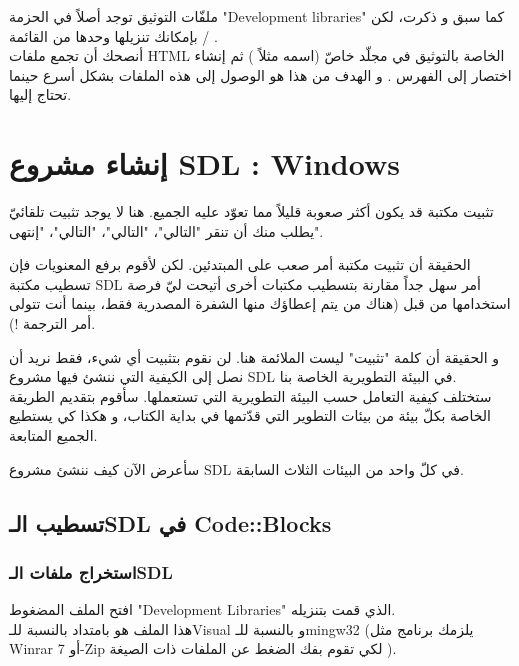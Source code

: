 ملفّات التوثيق توجد أصلاً في الحزمة
"\textenglish{Development libraries}"
كما سبق و ذكرت، لكن بإمكانك تنزيلها وحدها من القائمة
 / .\\
أنصحك أن تجمع ملفات
\textenglish{HTML}
الخاصة بالتوثيق في مجلّد خاصّ (اسمه مثلاً
)
ثم إنشاء اختصار إلى الفهرس
.
و الهدف من هذا هو الوصول إلى هذه الملفات بشكل أسرع حينما تحتاج إليها.

\section{إنشاء مشروع \textenglish{SDL} : \textenglish{Windows}}

تثبيت مكتبة قد يكون أكثر صعوبة قليلاً مما تعوّد عليه الجميع. هنا لا يوجد تثبيت تلقائيّ يطلب منك أن تنقر "التالي"، "التالي"، "التالي"، "إنتهى".

الحقيقة أن تثبيت مكتبة أمر صعب على المبتدئين. لكن لأقوم برفع المعنويات فإن تسطيب مكتبة 
\textenglish{SDL}
أمر سهل جداً مقارنة بتسطيب مكتبات أخرى أتيحت ليّ فرصة استخدامها من قبل (هناك من يتم إعطاؤك منها الشفرة المصدرية فقط، بينما أنت تتولى أمر الترجمة !).

و الحقيقة أن كلمة "تثبيت" ليست الملائمة هنا. لن نقوم بتثبيت أي شيء، فقط نريد أن نصل إلى الكيفية التي ننشئ فيها مشروع 
\textenglish{SDL}
في البيئة التطويرية الخاصة بنا.\\
ستختلف كيفية التعامل حسب البيئة التطويرية التي تستعملها. سأقوم بتقديم الطريقة الخاصة بكلّ بيئة من بيئات التطوير التي قدّتمها في بداية الكتاب، و هكذا كي يستطيع الجميع المتابعة.

سأعرض الآن كيف ننشئ مشروع
\textenglish{SDL}
في كلّ واحد من البيئات الثلاث السابقة.

\subsection{تسطيب الـ\textenglish{SDL} في \textenglish{Code::Blocks}}

\subsubsection{استخراج ملفات الـ\textenglish{SDL}}

افتح الملف المضغوط
"\textenglish{Development Libraries}"
الذي قمت بتنزيله.\\
هذا الملف هو بامتداد
بالنسبة للـ\textenglish{Visual}
و 
بالنسبة للـ\textenglish{mingw32}
(يلزمك برنامج مثل 
\textenglish{Winrar}
أو
\textenglish{7-Zip}
لكي تقوم بفك الضغط عن الملفات ذات الصيغة 
).

